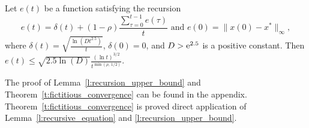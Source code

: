 \begin{lemma}\label{l:recursion_upper_bound}
  Let $e(t)$ be a function satisfying the recursion
  \[
    e(t) =
    \delta(t) + (1-\rho)\frac{\sum_{\tau=0}^{t-1}e(\tau)}{t}
    \text{ and } e(0)=\|x(0) - x^*\|_{\infty},
  \]
  where \(\delta(t) = \sqrt{\frac{\ln(D t^{2.5})}{t}} \), \(\delta(0) = 0 \),
  and $D > \mathrm{e}^{2.5}$ is a positive constant.  Then
  \(
    e(t) \leq
    \sqrt{2.5 \ln(D)} \frac{(\ln t)^{3/2}}{t^{\min(\rho,\, 1/2)}}.
  \)
\end{lemma}
\noindent The proof of Lemma~\ref{l:recursion_upper_bound}
and Theorem~\ref{t:fictitious_convergence}
can be found in the appendix. Theorem~\ref{t:fictitious_convergence} 
is proved direct application of Lemma~\ref{l:recursive_equation}
and \ref{l:recursion_upper_bound}.
